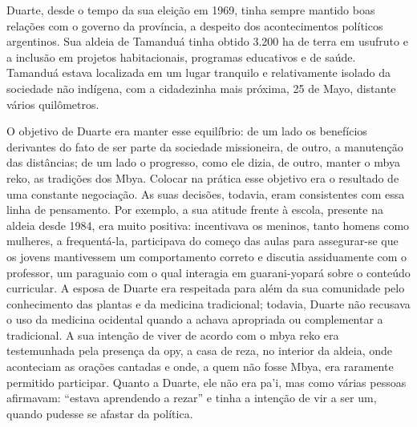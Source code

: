 Duarte, desde o tempo da sua eleição em 1969, tinha sempre mantido boas
relações com o governo da província, a despeito dos acontecimentos
políticos argentinos. Sua aldeia de Tamanduá tinha obtido 3.200 ha de
terra em usufruto e a inclusão em projetos habitacionais, programas
educativos e de saúde. Tamanduá estava localizada em um lugar tranquilo
e relativamente isolado da sociedade não indígena, com a cidadezinha
mais próxima, 25 de Mayo, distante vários quilômetros. 

O objetivo de Duarte era manter esse equilíbrio: de um lado os
benefícios derivantes do fato de ser parte da sociedade missioneira, de
outro, a manutenção das distâncias; de um lado o progresso, como ele
dizia, de outro, manter o mbya reko, as tradições dos Mbya. Colocar na
prática esse objetivo era o resultado de uma constante negociação. As
suas decisões, todavia, eram consistentes com essa linha de pensamento.
Por exemplo, a sua atitude frente à escola, presente na aldeia desde
1984, era muito positiva: incentivava os meninos, tanto homens como
mulheres, a frequentá-la, participava do começo das aulas para
assegurar-se que os jovens mantivessem um comportamento correto e
discutia assiduamente com o professor, um paraguaio com o qual
interagia em guarani-yopará sobre o conteúdo curricular. A esposa de
Duarte era respeitada para além da sua comunidade pelo conhecimento das
plantas e da medicina tradicional; todavia, Duarte não recusava o uso da
medicina ocidental quando a achava apropriada ou complementar a
tradicional. A sua intenção de viver de acordo com o mbya reko era
testemunhada pela presença da opy, a casa de reza, no interior da
aldeia, onde aconteciam as orações cantadas e onde, a quem não fosse
Mbya, era raramente permitido participar. Quanto a Duarte, ele não era
pa’i, mas como várias pessoas afirmavam: ``estava aprendendo a rezar'' e
tinha a intenção de vir a ser um, quando pudesse se afastar da
política.

